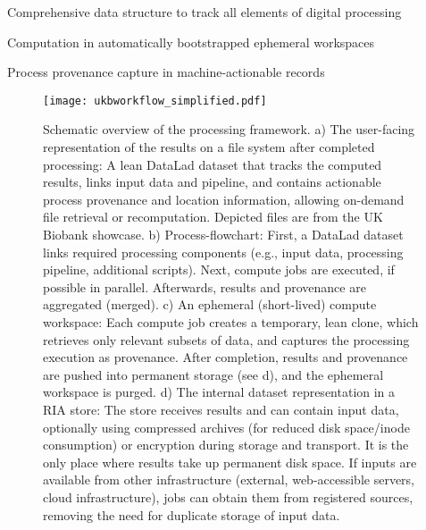 Comprehensive data structure to track all elements of digital processing

Computation in automatically bootstrapped ephemeral workspaces

Process provenance capture in machine-actionable records





\begin{figure}
	\centering
	\texttt{[image: ukbworkflow\_simplified.pdf]}
	\caption[Schematic overview of the processing framework]{Schematic overview of the processing framework. a) The user-facing representation of the results on a file system after completed processing: A lean DataLad dataset that tracks the computed results, links input data and pipeline, and contains actionable process provenance and location information, allowing on-demand file retrieval or recomputation. Depicted files are from the UK Biobank showcase. b) Process-flowchart: First, a DataLad dataset links required processing components (e.g., input data, processing pipeline, additional scripts). Next, compute jobs are executed, if possible in parallel. Afterwards, results and provenance are aggregated (merged). c) An ephemeral (short-lived) compute workspace: Each compute job creates a temporary, lean clone, which retrieves only relevant subsets of data, and captures the processing execution as provenance. After completion, results and provenance are pushed into permanent storage (see d), and the ephemeral workspace is purged. d) The internal dataset representation in a RIA store: The store receives results and can contain input data, optionally using compressed archives (for reduced disk space/inode consumption) or encryption during storage and transport. It is the only place where results take up permanent disk space. If inputs are available from other infrastructure (external, web-accessible servers, cloud infrastructure), jobs can obtain them from registered sources, removing the need for duplicate storage of input data.}
	\label{fig:fairly_workflow}
\end{figure}

